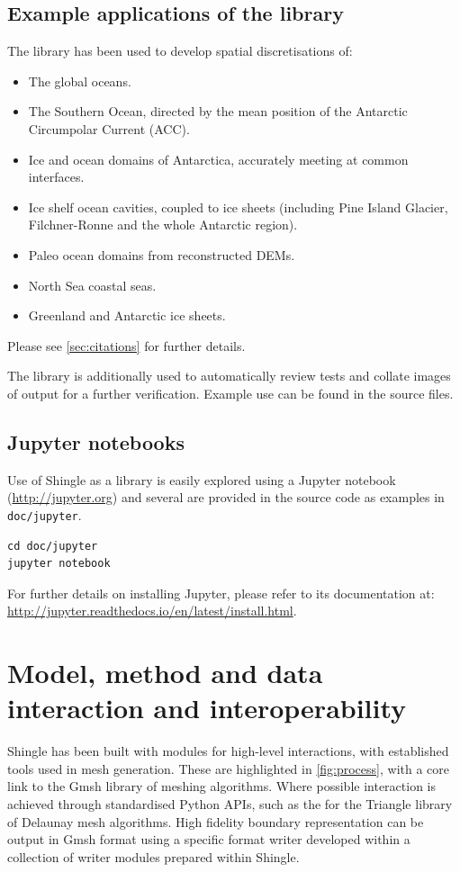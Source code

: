\documentclass[a4paper, 10pt]{book}
\providecommand{\shingle}{Shingle\xspace}
\begin{document}
\section{Example applications of the library}

The library has been used to develop spatial discretisations of:
\begin{itemize}
\item The global oceans.
\item The Southern Ocean, directed by the mean position of the Antarctic Circumpolar Current (ACC). 
\item Ice and ocean domains of Antarctica, accurately meeting at common interfaces.
\item Ice shelf ocean cavities, coupled to ice sheets (including Pine Island Glacier, Filchner-Ronne and the whole Antarctic region).
\item Paleo ocean domains from reconstructed DEMs.
\item North Sea coastal seas.
\item Greenland and Antarctic ice sheets.
\end{itemize}

\noindent
Please see \cref{sec:citations} for further details.

The library is additionally used to automatically review tests and collate images of output for a further verification.
Example use can be found in the source files.

\section{Jupyter notebooks}

Use of \shingle as a library is easily explored using a Jupyter notebook
(\url{http://jupyter.org}) and several are provided in the source code as examples in \verb+doc/jupyter+.

\begin{verbatim}
cd doc/jupyter
jupyter notebook
\end{verbatim}

\noindent
For further details on installing Jupyter, please refer to its documentation at:
\\
\url{http://jupyter.readthedocs.io/en/latest/install.html}.

\chapter{Model, method and data interaction and interoperability}
\label{sec:interaction}
%
%
\shingle has been built with modules for high-level interactions,
with established tools used in mesh generation.
%
These are highlighted in \cref{fig:process}, with a core link to the Gmsh library of meshing algorithms.
%
Where possible interaction is achieved through standardised Python APIs,
such as the \cite{trianglepython} for the Triangle \citep{triangle} library of Delaunay mesh algorithms.
%
High fidelity boundary representation can be output in Gmsh format
% 
using a specific format writer developed within a collection of writer modules prepared within \shingle.
%
\end{document}
